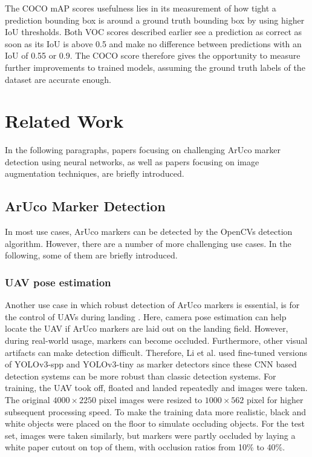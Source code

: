 \documentclass[10pt]{book}
\begin{document}
The \ac{COCO} \ac{mAP} scores usefulness lies in its measurement of how tight a prediction bounding box is around a ground truth bounding box by using higher \ac{IoU} thresholds. Both VOC scores described earlier see a prediction as correct as soon as its \ac{IoU} is above 0.5 and make no difference between predictions with an \ac{IoU} of 0.55 or 0.9. The \ac{COCO} score therefore gives the opportunity to measure further improvements to trained models, assuming the ground truth labels of the dataset are accurate enough.

\chapter{Related Work}
\label{chap:relatedw}

In the following paragraphs, papers focusing on challenging \ac{ArUco} marker detection using neural networks, as well as papers focusing on image augmentation techniques, are briefly introduced.

\section{ArUco Marker Detection}

In most use cases, \ac{ArUco} markers can be detected by the \acp{OpenCV} detection algorithm. However, there are a number of more challenging use cases. In the following, some of them are briefly introduced.

\subsection{UAV pose estimation}

Another use case in which robust detection of \ac{ArUco} markers is essential, is for the control of \acp{UAV} during landing \cite{li2020aruco}. Here, camera pose estimation can help locate the \ac{UAV} if \ac{ArUco} markers are laid out on the landing field. However, during real-world usage, markers can become occluded. Furthermore, other visual artifacts can make detection difficult. Therefore, Li et al. used fine-tuned versions of \ac{YOLO}v3-spp and \ac{YOLO}v3-tiny as marker detectors since these \ac{CNN} based detection systems can be more robust than classic detection systems. For training, the \ac{UAV} took off, floated and landed repeatedly and images were taken. The original $4000 \times 2250$ pixel images were resized to $1000 \times 562$ pixel for higher subsequent processing speed. To make the training data more realistic, black and white objects were placed on the floor to simulate occluding objects. For the test set, images were taken similarly, but markers were partly occluded by laying a white paper cutout on top of them, with occlusion ratios from 10\% to 40\%. 
\end{document}
